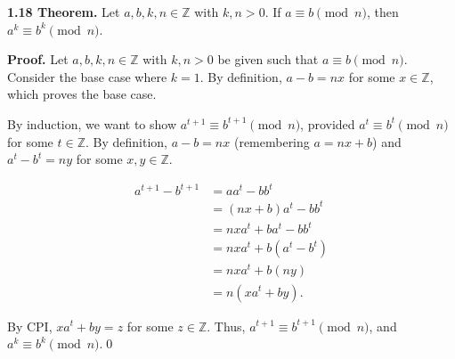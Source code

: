 \documentclass[12pt]{article}
\begin{document}
\noindent\textbf{1.18 Theorem.} Let $a,b,k,n\in\mathbb{Z}$ with $k,n>0$. If $a\equiv b\pmod{n}$, then $a^k\equiv b^k\pmod{n}$.

\bigskip

\noindent\textbf{Proof.} Let $a,b,k,n\in\mathbb{Z}$ with $k,n>0$ be given such that $a\equiv b\pmod{n}$. Consider the base case where $k=1$. By definition, $a-b=nx$ for some $x\in\mathbb{Z}$, which proves the base case.

\bigskip

\noindent By induction, we want to show $a^{t+1}\equiv b^{t+1}\pmod{n}$, provided $a^t\equiv b^t\pmod{n}$ for some $t\in\mathbb{Z}$. By definition, $a-b=nx$ (remembering $a=nx+b$) and $a^t-b^t=ny$ for some $x,y\in\mathbb{Z}$.

\begin{align*}
a^{t+1}-b^{t+1} &= aa^t - bb^t\\
&= (nx+b)a^t - bb^t\\
&= nxa^t + ba^t - bb^t\\
&= nxa^t + b(a^t-b^t)\\
&= nxa^t + b(ny)\\
&= n(xa^t + by).
\end{align*}

\noindent By CPI, $xa^t + by=z$ for some $z\in\mathbb{Z}$. Thus, $a^{t+1}\equiv b^{t+1}\pmod{n}$, and $a^k\equiv b^k\pmod{n}$.\qed
\end{document}
